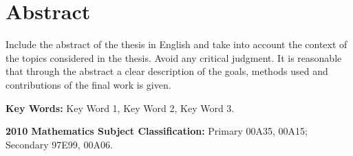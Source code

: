 \chapter*{Abstract}

Include the abstract of the thesis in English and take into account the context of
the topics considered in the thesis.
Avoid any critical judgment.
It is reasonable that through the abstract a clear description of the goals,
methods used and contributions of the final work is given.

\bigskip
\textbf{Key Words:}
Key Word 1, Key Word 2, Key Word 3.

\bigskip
\textbf{2010 Mathematics Subject Classification:}
Primary 00A35, 00A15;  Secondary 97E99, 00A06.
